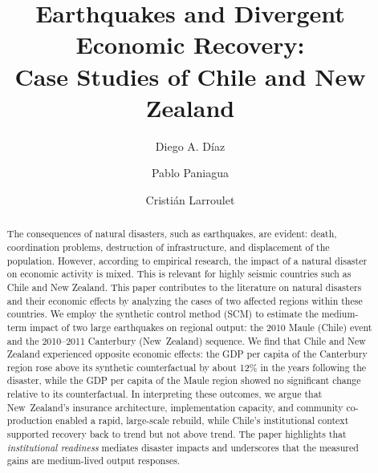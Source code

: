 
\doublespacing

\title{\Large\textbf{Earthquakes and Divergent Economic Recovery:\\
Case Studies of Chile and New Zealand}}

\author[1]{Diego A. Díaz}
\author[2]{Pablo Paniagua}
\author[1]{Cristián Larroulet}



\maketitle

\begin{abstract}
\singlespacing
The consequences of natural disasters, such as earthquakes, are evident: death, coordination problems, destruction of infrastructure, and displacement of the population. However, according to empirical research, the impact of a natural disaster on economic activity is mixed. This is relevant for highly seismic countries such as Chile and New Zealand. This paper contributes to the literature on natural disasters and their economic effects by analyzing the cases of two affected regions within these countries. We employ the synthetic control method (SCM) to estimate the medium-term impact of two large earthquakes on regional output: the 2010 Maule (Chile) event and the 2010--2011 Canterbury (New~Zealand) sequence. We find that Chile and New Zealand experienced opposite economic effects: the GDP per capita of the Canterbury region rose above its synthetic counterfactual by about 12\% in the years following the disaster, while the GDP per capita of the Maule region showed no significant change relative to its counterfactual. In interpreting these outcomes, we argue that New~Zealand’s insurance architecture, implementation capacity, and community co-production enabled a rapid, large-scale rebuild, while Chile’s institutional context supported recovery back to trend but not above trend. The paper highlights that \textit{institutional readiness} mediates disaster impacts and underscores that the measured gains are medium-lived output responses.
\end{abstract}

